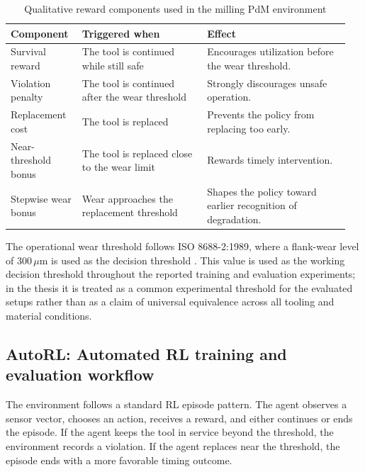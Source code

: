 \documentclass[12pt,oneside]{book}
\begin{document}
\begin{table}[htbp]
\centering
\caption{Qualitative reward components used in the milling PdM environment}
\label{tab:reward-shaping}
\begin{tabular}{L{0.2\linewidth} L{0.35\linewidth} L{0.4\linewidth}}
\toprule
\textbf{Component} & \textbf{Triggered when} & \textbf{Effect} \\
\midrule
Survival reward & The tool is continued while still safe & Encourages utilization before the wear threshold. \\
Violation penalty & The tool is continued after the wear threshold & Strongly discourages unsafe operation. \\
Replacement cost & The tool is replaced & Prevents the policy from replacing too early. \\
Near-threshold bonus & The tool is replaced close to the wear limit & Rewards timely intervention. \\
Stepwise wear bonus & Wear approaches the replacement threshold & Shapes the policy toward earlier recognition of degradation. \\
\bottomrule
\end{tabular}
\end{table}

The operational wear threshold follows ISO 8688-2:1989, where a flank-wear level of $300\,\mu\mathrm{m}$ is used as the decision threshold \cite{ISO8688-2-1989}. This value is used as the working decision threshold throughout the reported training and evaluation experiments; in the thesis it is treated as a common experimental threshold for the evaluated setups rather than as a claim of universal equivalence across all tooling and material conditions.

\subsection{AutoRL: Automated RL training and evaluation workflow}
The environment follows a standard RL episode pattern. The agent observes a sensor vector, chooses an action, receives a reward, and either continues or ends the episode. If the agent keeps the tool in service beyond the threshold, the environment records a violation. If the agent replaces near the threshold, the episode ends with a more favorable timing outcome.

\end{document}
